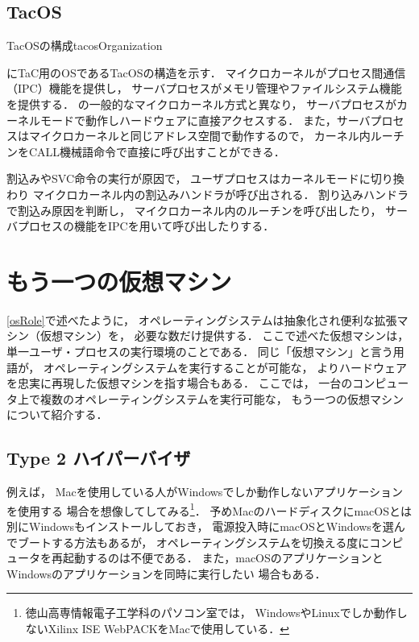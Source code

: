 \subsection{TacOS}
{TacOSの構成}{tacosOrganization}

にTaC用のOSであるTacOSの構造を示す．
マイクロカーネルがプロセス間通信（IPC）機能を提供し，
サーバプロセスがメモリ管理やファイルシステム機能を提供する．
の一般的なマイクロカーネル方式と異なり，
サーバプロセスがカーネルモードで動作しハードウェアに直接アクセスする．
また，サーバプロセスはマイクロカーネルと同じアドレス空間で動作するので，
カーネル内ルーチンをCALL機械語命令で直接に呼び出すことができる．

割込みやSVC命令の実行が原因で，
ユーザプロセスはカーネルモードに切り換わり
マイクロカーネル内の割込みハンドラが呼び出される．
割り込みハンドラで割込み原因を判断し，
マイクロカーネル内のルーチンを呼び出したり，
サーバプロセスの機能をIPCを用いて呼び出したりする．

\section{もう一つの仮想マシン}

\ref{osRole}で述べたように，
オペレーティングシステムは抽象化され便利な拡張マシン（仮想マシン）を，
必要な数だけ提供する．
ここで述べた仮想マシンは，単一ユーザ・プロセスの実行環境のことである．
同じ「仮想マシン」と言う用語が，
オペレーティングシステムを実行することが可能な，
よりハードウェアを忠実に再現した仮想マシンを指す場合もある．
ここでは，
一台のコンピュータ上で複数のオペレーティングシステムを実行可能な，
もう一つの仮想マシンについて紹介する．

\subsection{Type 2 ハイパーバイザ}
例えば，
Macを使用している人がWindowsでしか動作しないアプリケーションを使用する
場合を想像してしてみる\footnote{
徳山高専情報電子工学科のパソコン室では，
WindowsやLinuxでしか動作しないXilinx ISE WebPACKをMacで使用している．}．
予めMacのハードディスクにmacOSとは別にWindowsもインストールしておき，
電源投入時にmacOSとWindowsを選んでブートする方法もあるが，
オペレーティングシステムを切換える度にコンピュータを再起動するのは不便である．
また，macOSのアプリケーションとWindowsのアプリケーションを同時に実行したい
場合もある．

